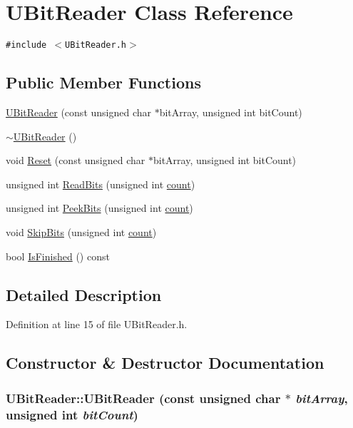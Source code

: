 \hypertarget{class_u_bit_reader}{
\section{UBitReader Class Reference}
\label{class_u_bit_reader}
}
{\tt \#include $<$UBitReader.h$>$}

\subsection*{Public Member Functions}
\begin{CompactItemize}
\item 
\hyperlink{class_u_bit_reader_3e85c8aa0a1087a518475bdb7bdbee62}{UBitReader} (const unsigned char $\ast$bitArray, unsigned int bitCount)
\item 
\hyperlink{class_u_bit_reader_b9498a7895fb9993fb7ec5ac6a533dc2}{$\sim$UBitReader} ()
\item 
void \hyperlink{class_u_bit_reader_bfd4df4797cd828c904ae5fff3153499}{Reset} (const unsigned char $\ast$bitArray, unsigned int bitCount)
\item 
unsigned int \hyperlink{class_u_bit_reader_0de30069dca391af5444904cb7c6da09}{ReadBits} (unsigned int \hyperlink{wglext_8h_98d18d6b4e3ba4ed266c6fb54c839d70}{count})
\item 
unsigned int \hyperlink{class_u_bit_reader_4744716f48876dde16fc77d995874dfe}{PeekBits} (unsigned int \hyperlink{wglext_8h_98d18d6b4e3ba4ed266c6fb54c839d70}{count})
\item 
void \hyperlink{class_u_bit_reader_1d593ed1bb42821586c7ab7f82cabca6}{SkipBits} (unsigned int \hyperlink{wglext_8h_98d18d6b4e3ba4ed266c6fb54c839d70}{count})
\item 
bool \hyperlink{class_u_bit_reader_c16aa31ff853ab9423122d02e6e6e451}{IsFinished} () const 
\end{CompactItemize}


\subsection{Detailed Description}


Definition at line 15 of file UBitReader.h.

\subsection{Constructor \& Destructor Documentation}
\hypertarget{class_u_bit_reader_3e85c8aa0a1087a518475bdb7bdbee62}{
\subsubsection[{UBitReader}]{\setlength{\rightskip}{0pt plus 5cm}UBitReader::UBitReader (const unsigned char $\ast$ {\em bitArray}, \/  unsigned int {\em bitCount})}}
\label{class_u_bit_reader_3e85c8aa0a1087a518475bdb7bdbee62}




